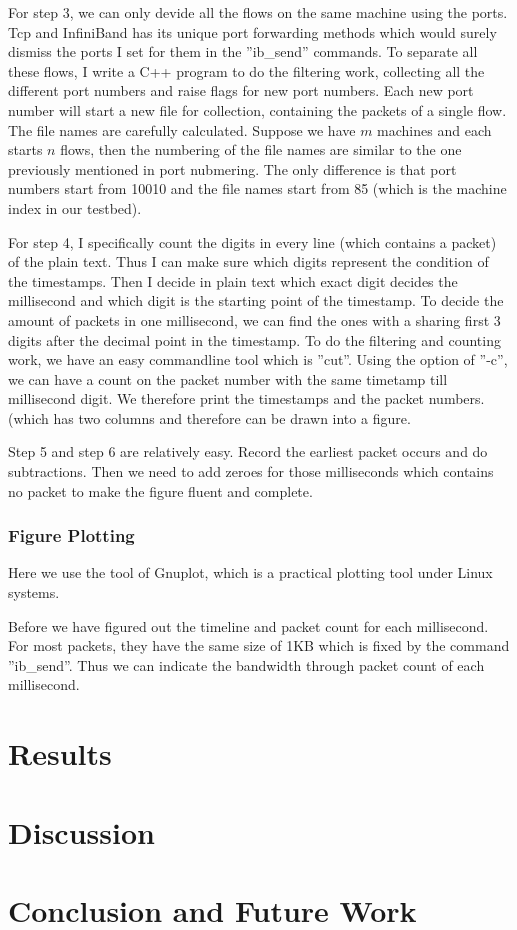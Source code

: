 \documentclass[12pt,a4paper]{article}
\begin{document}
For step 3, we can only devide all the flows on the same machine using the ports.
Tcp and InfiniBand has its unique port forwarding methods which would surely dismiss the ports I set for them in the ''ib\_send'' commands.
To separate all these flows, I write a C++ program to do the filtering work, collecting all the different port numbers and raise flags for new port numbers.
Each new port number will start a new file for collection, containing the packets of a single flow.
The file names are carefully calculated.
Suppose we have $m$ machines and each starts $n$ flows, then the numbering of the file names are similar to the one previously mentioned in port nubmering.
The only difference is that port numbers start from 10010 and the file names start from 85 (which is the machine index in our testbed).

For step 4, I specifically count the digits in every line (which contains a packet) of the plain text. Thus I can make sure which digits represent the condition
of the timestamps. 
Then I decide in plain text which exact digit decides the millisecond and which digit is the starting point of the timestamp.
To decide the amount of packets in one millisecond, we can find the ones with a sharing first 3 digits after the decimal point in the timestamp.
To do the filtering and counting work, we have an easy commandline tool which is ''cut''.
Using the option of ''-c'', we can have a count on the packet number with the same timetamp till millisecond digit.
We therefore print the timestamps and the packet numbers. (which has two columns and therefore can be drawn into a figure.

Step 5 and step 6 are relatively easy. 
Record the earliest packet occurs and do subtractions.
Then we need to add zeroes for those milliseconds which contains no packet to make the figure fluent and complete.

\subsubsection{Figure Plotting}

Here we use the tool of Gnuplot, which is a practical plotting tool under Linux systems.

Before we have figured out the timeline and packet count for each millisecond.
For most packets, they have the same size of 1KB which is fixed by the command ''ib\_send''.
Thus we can indicate the bandwidth through packet count of each millisecond.

\section{Results}

\section{Discussion}

\section{Conclusion and Future Work}






\end{document}
